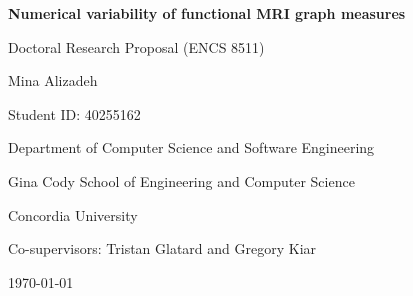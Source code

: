 \documentclass[12pt,letterpaper,oneside]{report}
\newcommand{\projecttitle}{Numerical variability of functional MRI graph measures}
\begin{document}
\hypersetup{pageanchor=false}
\begin{titlepage}
  \centering
  \vspace*{1.25in}
  {\Large\bfseries \projecttitle\par}
  \vspace{0.7in}
  {\large Doctoral Research Proposal (ENCS 8511)\par}
  \vspace{0.25in}
  {\large Mina Alizadeh\par}
  {\large Student ID: 40255162\par}
  \vfill
  {\large Department of Computer Science and Software Engineering\par}
  {\large Gina Cody School of Engineering and Computer Science\par}
  {\large Concordia University\par}
  \vspace{0.5in}
  {\large Co-supervisors: Tristan Glatard and Gregory Kiar\par}
  \vspace{0.5in}
  {\large \today\par}
\end{titlepage}

\hypersetup{pageanchor=true}

\tableofcontents
\listoffigures
\clearpage







\printbibliography[heading=bibintoc,title={References}]
\end{document}
